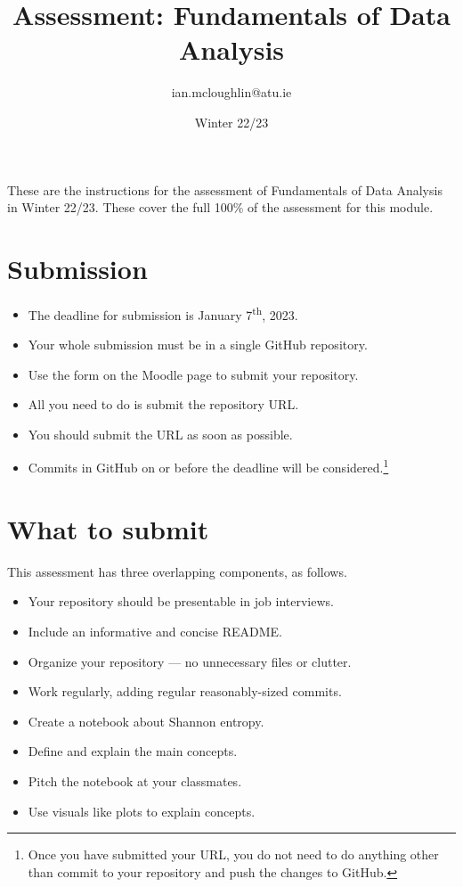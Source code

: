 \documentclass[a4paper]{tufte-handout}
\title{Assessment: Fundamentals of Data Analysis}
\author{ian.mcloughlin@atu.ie}
\date{Winter 22/23}
\begin{document}
 
\maketitle

These are the instructions for the assessment of Fundamentals of Data Analysis in Winter 22/23.
These cover the full 100\% of the assessment for this module.


\section{Submission}

\begin{itemize}
  \item The deadline for submission is January 7\textsuperscript{th}, 2023. 
  \item Your whole submission must be in a single GitHub repository.
  \item Use the form on the Moodle page to submit your repository.
  \item All you need to do is submit the repository URL.
  \item You should submit the URL as soon as possible.
  \item Commits in GitHub on or before the deadline will be considered.\footnote{Once you have submitted your URL, you do not need to do anything other than commit to your repository and push the changes to GitHub.}
\end{itemize}


\section{What to submit}
This assessment has three overlapping components, as follows.

\begin{itemize}
  \item Your repository should be presentable in job interviews.
  \item Include an informative and concise README.
  \item Organize your repository --- no unnecessary files or clutter.
  \item Work regularly, adding regular reasonably-sized commits.
\end{itemize}

\begin{itemize}
  \item Create a notebook about Shannon entropy.
  \item Define and explain the main concepts.
  \item Pitch the notebook at your classmates.
  \item Use visuals like plots to explain concepts.
\end{itemize}
\end{document}
